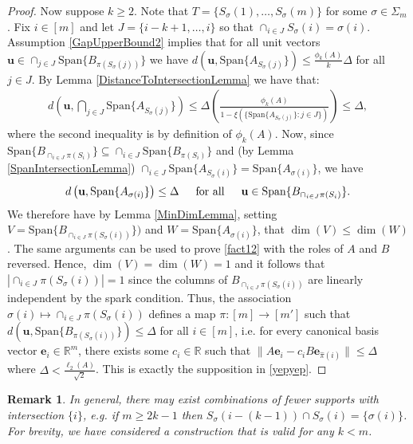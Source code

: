 \documentclass[journal, onecolumn]{IEEEtran}
\newtheorem{remark}{Remark}
\begin{document}
\begin{proof}
Now suppose $k \geq 2$. Note that $T = \{S_\sigma(1), \ldots, S_\sigma(m)\}$ for some $\sigma \in \Sigma_m$. Fix $i \in [m]$ and let $J = \{i-k+1, \ldots, i\}$ so that $\cap_{i \in J} S_\sigma(i) = \sigma(i)$. Assumption \eqref{GapUpperBound2} implies that for all unit vectors $\mathbf{u} \in \cap_{j \in J} \text{Span}\{B_{\pi(S_\sigma(j))}\}$ we have $d(\mathbf{u}, \text{Span}\{A_{S_\sigma(j)}\}) \leq \frac{\phi_k(A)}{k} \Delta$ for all $j \in J$. By Lemma \ref{DistanceToIntersectionLemma} we have that:
\begin{align}\label{sym2}
d\left( \mathbf{u}, \bigcap_{j \in J} \text{Span}\{A_{S_{\sigma}(j)}\} \right) 
\leq \Delta \left( \frac{\phi_k(A)}{1 - \xi(\{ \text{Span}\{A_{S_{\sigma}(j)}\} : j \in J \})} \right) \leq \Delta,
\end{align}
%
where the second inequality is by definition of $\phi_k(A)$. Now, since $\text{Span}\{B_{\cap_{i \in J}\pi(S_i)}\} \subseteq \cap_{i \in J} \text{Span}\{B_{\pi(S_i)}\}$ and (by Lemma \ref{SpanIntersectionLemma}) $\cap_{i \in J}  \text{Span}\{A_{S_\sigma(i)}\} = \text{Span}\{A_{\sigma(i)}\}$, we have
\begin{align}\label{fact12}
d\left( \mathbf{u}, \text{Span}\{A_{\sigma(i)}\} \right) \leq \Delta \indent \text{for all} \indent \mathbf{u} \in \text{Span}\{B_{\cap_{i \in J}\pi(S_i)}\}.
\end{align}
We therefore have by Lemma \ref{MinDimLemma}, setting $V = \text{Span}\{B_{\cap_{i \in J}\pi(S_\sigma(i))}\})$ and $W = \text{Span}\{A_{\sigma(i)}\}$, that $\dim(V) \leq \dim(W)$. The same arguments can be used to prove \eqref{fact12} with the roles of $A$ and $B$ reversed. Hence, $\dim(V) = \dim(W) = 1$ and it follows that $|\cap_{i \in J} \pi(S_\sigma(i))| = 1$ since the columns of $B_{\cap_{i \in J} \pi(S_\sigma(i))}$ are linearly independent by the spark condition. Thus, the association $\sigma(i) \mapsto \cap_{i \in J} \pi(S_\sigma(i))$ defines a map $\pi: [m] \to [m']$ such that $d\left( \mathbf{u}, \text{Span}\{B_{ \pi(S_\sigma(i))}\}\right) \leq \Delta$ for all $i \in [m]$, i.e. for every canonical basis vector $\mathbf{e}_i \in \mathbb{R}^m$, there exists some $c_i \in \mathbb{R}$ such that $\|A\mathbf{e}_i - c_iB\mathbf{e}_{\hat \pi(i)}\| \leq \Delta$ where $\Delta < \frac{\ell_{2}(A)}{\sqrt{2}}$. This is exactly the supposition in \eqref{yepyep}.
\end{proof}

\begin{remark} In general, there may exist combinations of fewer supports with intersection $\{i\}$, e.g. if $m \geq 2k-1$ then $S_\sigma(i - (k-1)) \cap S_\sigma(i) = \{\sigma(i)\}$. For brevity, we have considered a construction that is valid for any $k < m$.
\end{remark}
\end{document}
